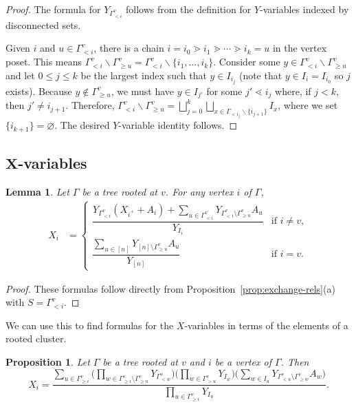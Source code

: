 \documentclass[pdftex]{sigma}
\numberwithin{equation}{section}
\newtheorem{Lemma}[Theorem]{Lemma}
\newtheorem{Proposition}[Theorem]{Proposition}
 { \theoremstyle{definition}
\newtheorem{Definition}[Theorem]{Definition}
\newtheorem{Note}[Theorem]{Note}
\newtheorem{Example}[Theorem]{Example}
\newtheorem{Remark}[Theorem]{Remark} }
\begin{document}
\begin{proof}
The formula for $Y_{\Gamma_{< i}^v}$ follows from the definition for $Y$-variables indexed by disconnected sets.

Given $i$ and $u \in \Gamma_{< i}^{v}$, there is a chain $i = i_0 \gtrdot i_1 \gtrdot \cdots \gtrdot i_k = u$ in the vertex poset. This means $\Gamma_{< i}^v \backslash \Gamma_{\geq u}^v = \Gamma_{< i}^v \backslash \{ i_1, \dots, i_k \}.$ Consider some $y \in \Gamma_{< i}^v \backslash \Gamma_{\geq u}^v$ and let $0 \leq j \leq k$ be the largest index such that $y \in I_{i_j}$ (note that $y\in I_i=I_{i_0}$ so $j$ exists). Because $y \not\in \Gamma_{\geq u}^v$, we must have $y \in I_{j'}$ for some $j' \lessdot i_j$ where, if $j < k$, then $j' \neq i_{j+1}$.
Therefore, $\Gamma_{< i}^v \backslash \Gamma_{\geq u}^v = \bigsqcup_{j = 0}^k \bigsqcup_{x \in \Gamma_{\lessdot i_j} \backslash \{ i_{j+1} \}} I_{x}$, where we set $\{i_{k+1}\} = \varnothing$. The desired $Y$-variable identity follows.
\end{proof}

\subsection[X-variables]{$\boldsymbol{X}$-variables}\label{sec:X-formulas}

\begin{Lemma}\label{lem:X-formula-1}
Let $\Gamma$ be a tree rooted at $v$. For any vertex $i$ of $\Gamma$,
\begin{align*}
 X_i &= \begin{cases}
 \dfrac{Y_{\Gamma_{< i}^v}(X_{i^+}+A_i)+\sum_{u\in \Gamma_{< i}^v}Y_{\Gamma_{< i}^v\setminus\Gamma_{\geq u}^v}A_u}{Y_{I_i}} & \textrm{if } i \neq v, \\
 \dfrac{\sum_{u\in [n]}Y_{[n]\setminus\Gamma_{\geq u}^v}A_u}{Y_{[n]}} & \textrm{if } i = v.
 \end{cases}
\end{align*}
\end{Lemma}

\begin{proof}
These formulas follow directly from Proposition~\ref{prop:exchange-rels}(a) with $S=\Gamma_{< i}^v$.
\end{proof}

We can use this to find formulas for the $X$-variables in terms of the elements of a rooted cluster.

\begin{Proposition}\label{prop:X-formula-2}
Let $\Gamma$ be a tree rooted at $v$ and $i$ be a vertex of $\Gamma$. Then \[X_i=\frac{\sum_{u\in\Gamma_{\geq i}^v}\Big(\prod_{w\in\Gamma_{\geq i}^v\setminus\Gamma_{\geq u}^v} Y_{\Gamma_{< w}^v}\Big)\Big(\prod_{w\in\Gamma_{> u}^v} Y_{I_w}\Big)\Big(\sum_{w\in I_u}Y_{\Gamma_{< u}^v\setminus\Gamma_{\geq w}^v}A_w\Big)}{\prod_{u\in\Gamma_{\geq i}^v}Y_{I_u}}.\]
\end{Proposition}
\end{document}
